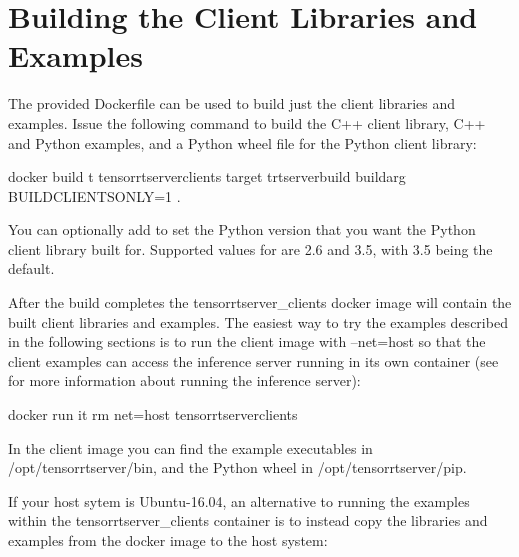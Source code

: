 \documentclass[letterpaper,10pt,english]{sphinxmanual}
\begin{document}
\section{Building the Client Libraries and Examples}
\label{\detokenize{client:building-the-client-libraries-and-examples}}\label{\detokenize{client:section-building-the-client-libraries-and-examples}}
The provided Dockerfile can be used to build just the client libraries
and examples. Issue the following command to build the C++ client
library, C++ and Python examples, and a Python wheel file for the
Python client library:

\begin{sphinxVerbatim}[commandchars=\\\{\}]
\PYGZdl{} docker build \PYGZhy{}t tensorrtserver\PYGZus{}clients \PYGZhy{}\PYGZhy{}target trtserver\PYGZus{}build \PYGZhy{}\PYGZhy{}build\PYGZhy{}arg \PYGZdq{}BUILD\PYGZus{}CLIENTS\PYGZus{}ONLY=1\PYGZdq{} .
\end{sphinxVerbatim}

You can optionally add  to set the Python
version that you want the Python client library built for. Supported
values for  are 2.6 and 3.5, with 3.5 being the default.

After the build completes the tensorrtserver\_clients docker image will
contain the built client libraries and examples. The easiest way to
try the examples described in the following sections is to run the
client image with --net=host so that the client examples can access
the inference server running in its own container (see
{\hyperref[\detokenize{run:section-running-the-inference-server}]{}} for more information about
running the inference server):

\begin{sphinxVerbatim}[commandchars=\\\{\}]
\PYGZdl{} docker run \PYGZhy{}it \PYGZhy{}\PYGZhy{}rm \PYGZhy{}\PYGZhy{}net=host tensorrtserver\PYGZus{}clients
\end{sphinxVerbatim}

In the client image you can find the example executables in
/opt/tensorrtserver/bin, and the Python wheel in
/opt/tensorrtserver/pip.

If your host sytem is Ubuntu-16.04, an alternative to running the
examples within the tensorrtserver\_clients container is to instead
copy the libraries and examples from the docker image to the host
system:
\end{document}
